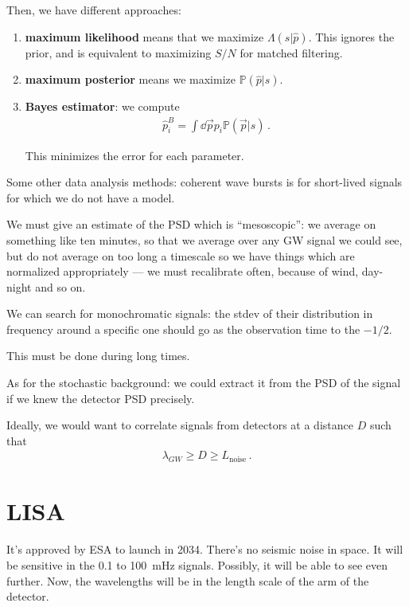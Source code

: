 \documentclass[main.tex]{subfiles}
\begin{document}
Then, we have different approaches:
\begin{enumerate}
    \item \textbf{maximum likelihood} means that we maximize \(\Lambda (s | \hat{p})\). This ignores the prior, and is equivalent to maximizing \(S / N\) for matched filtering. 
    \item \textbf{maximum posterior} means we maximize \(\mathbb{P}(\hat{p} | s)\). 
    \item \textbf{Bayes estimator}: we compute 
    \begin{align}
    \hat{p}_{i}^{B} = \int \dd{\vec{p}} p_{i} \mathbb{P}(\vec{p} | s)
    \,.
    \end{align}
    
    This minimizes the error for each parameter.
\end{enumerate}

Some other data analysis methods: coherent wave bursts is for short-lived signals for which we do not have a model. 

We must give an estimate of the PSD which is ``mesoscopic'': we average on something like ten minutes, so that we average over any GW signal we could see, but do not average on too long a timescale so we have things which are normalized appropriately --- we must recalibrate often, because of wind, day-night and so on.

We can search for monochromatic signals: the stdev of their distribution in frequency around a specific one should go as the observation time to the \(-1/2\).

This must be done during long times.

As for the stochastic background: we could extract it from the PSD of the signal if we knew the detector PSD precisely.

Ideally, we would want to correlate signals from detectors at a distance \(D\) such that 
%
\begin{align}
\lambda_{GW} \geq D \geq L _{\text{noise}}
\,.
\end{align}

\section{LISA}

It's approved by ESA to launch in 2034. 
There's no seismic noise in space. 
It will be sensitive in the \num{.1} to \SI{100}{mHz} signals. 
Possibly, it will be able to see even further.
Now, the wavelengths will be in the length scale of the arm of the detector. 
\end{document}
